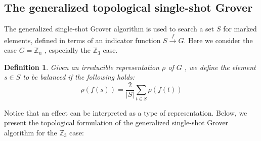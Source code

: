 \documentclass[a4paper,twocolumn,11pt,unpublished]{quantumarticle}
\newtheorem{definition}[theorem]{Definition}
\numberwithin{equation}{section}
\begin{document}
\subsection{The generalized topological single-shot Grover }
 The  generalized single-shot Grover algorithm is used to search a set $S$ for marked elements, defined in terms of an indicator function $S \xrightarrow{f}G$. Here we consider the case $G=\mathbb{Z}_n$ , especially the $\mathbb{Z}_3$ case.
\begin{definition}
Given an irreducible representation
$\rho$ of $G$ , we define the element $s \in S $ to be balanced if the following holds:
\[
\rho(f(s))=\frac{2}{|S|}\sum_{t\in S}\rho(f(t))
\]
\end{definition}

Notice that an effect can be interpreted as a type of representation. Below, we present the topological formulation of the generalized single-shot Grover algorithm for the $\mathbb{Z}_3$ case:
\end{document}
